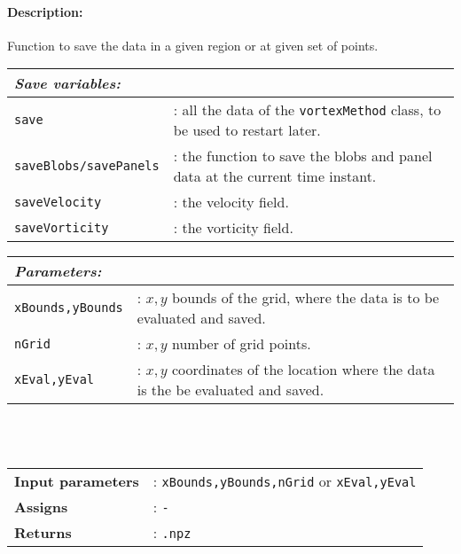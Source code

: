 	\paragraph{Description:} Function to save the data in a given region or at given set of points.\\

		\begin{tabular}{lp{10cm}}
			\textit{Save variables:} & \\ \hline
			\texttt{save} &: all the data of the \texttt{vortexMethod} class, to be used to restart later.\\ 			
			\texttt{saveBlobs/savePanels} &: the function to save the blobs and panel data at the current time instant.\\ 			
			\texttt{saveVelocity} &: the velocity field.\\ 
			\texttt{saveVorticity} &: the vorticity field.\\ 
		\end{tabular} \vspace{5 mm}
	
		\begin{tabular}{lp{10cm}}
			\textit{Parameters:} & \\ \hline
			\texttt{xBounds,yBounds} &: $x,y$ bounds of the grid, where the data is to be evaluated and saved.\\ 
			\texttt{nGrid} &: $x,y$ number of grid points.\\ 
			\texttt{xEval,yEval} &: $x,y$ coordinates of the location where the data is the be evaluated and saved.\\ 
		\end{tabular} \vspace{5 mm}\\
	\\
	\begin{tabular}{lp{10cm}}
		\textbf{Input parameters} &: \texttt{xBounds,yBounds,nGrid} or \texttt{xEval,yEval}\\ 
		\textbf{Assigns} &: \texttt{-}\\ 			
		\textbf{Returns} &: \texttt{.npz}\\ 					
	\end{tabular}

